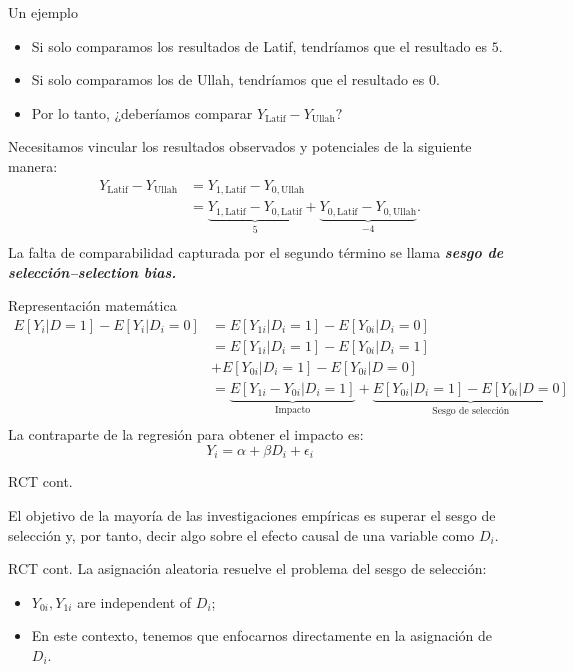 \documentclass[11pt, aspectratio=169, compress]{beamer}
\begin{document}
\begin{frame}{Un ejemplo}
\begin{itemize}
\item Si solo comparamos los resultados de Latif, tendríamos que el resultado es $ 5 $. 
\item Si solo comparamos los de Ullah, tendríamos que el resultado es $ 0 $.
\item Por lo tanto, ¿deberíamos comparar $ Y_{\mathrm{Latif}} - Y_{\mathrm{Ullah}} ? $
\end{itemize}

Necesitamos vincular los resultados observados y potenciales de la siguiente manera:
\begin{align*}
Y_{\mathrm{Latif}} - Y_{\mathrm{Ullah}} &= Y_{1,\mathrm{Latif}} - Y_{0,\mathrm{Ullah}} \\ 
&= \underbrace{Y_{1,\mathrm{Latif}} - Y_{0,\mathrm{Latif}}}_{5} + \underbrace{Y_{0,\mathrm{Latif}} - Y_{0,\mathrm{Ullah}}}_{-4}. \\ 
\end{align*}
La falta de comparabilidad capturada por el segundo término se llama \textit{\textbf{sesgo de selección--selection bias.}}
\end{frame}
\begin{frame}{Representación matemática}
\begin{align*}
E[Y_i | D=1] - E[Y_i | D_i=0] &= E[Y_{1i} | D_i=1] - E[Y_{0i} | D_i=0] \\
&= E[Y_{1i} | D_i=1] - E[Y_{0i} | D_i=1] \\
&+ E[Y_{0i} | D_i=1] - E[Y_{0i} | D=0] \\ 
&= \underbrace{E[Y_{1i} - Y_{0i} | D_i=1]}_{\text{Impacto}} +  \underbrace{E[Y_{0i} | D_i=1] - E[Y_{0i} | D=0]}_{\text{Sesgo de selección}}\\ 
\end{align*}
La contraparte de la regresión para obtener el impacto es:
\begin{equation}
Y_i = \alpha + \beta D_{i} + \epsilon_i 
\end{equation}
\end{frame}
\begin{frame}{RCT cont.}
	\begin{center}
		El objetivo de la mayoría de las investigaciones empíricas es superar el sesgo de selección y, por tanto, decir algo sobre el efecto causal de una variable como $D_i$. 
	\end{center}
\end{frame}
\begin{frame}{RCT cont.}
	La asignación aleatoria resuelve el problema del sesgo de selección: 
	\begin{itemize}
		\item $Y_{0i}, Y_{1i}$ are independent of $D_i$; 
		\item En este contexto, tenemos que enfocarnos directamente en la asignación de $D_i$.
	\end{itemize}
\end{frame}
\end{document}
